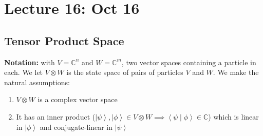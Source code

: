 \documentclass[12pt]{article}
\newcommand{\brak}[1]{\left\langle #1 \right\rangle}
\newcommand{\C}{\mathbb{C}}
\newcommand{\ket}[1]{\left\vert #1 \right\rangle}
\begin{document}
\section*{Lecture 16: Oct 16}
\subsection*{Tensor Product Space}
\textbf{Notation:} with $V = \C^n$ and $W = \C^m$, two vector spaces containing a particle in each. We let $V \otimes W$ is the state space of pairs of particles $V$ and $W$. We make the natural assumptions:
\begin{enumerate}
    \item $V \otimes W$ is a complex vector space 
    \item It has an inner product ($\ket \psi, \ket \phi \in V\otimes W \implies \brak{\psi \; | \; \phi} \in \C$) which is linear in $\ket \phi$ and conjugate-linear in $\ket \psi$
\end{enumerate}
\end{document}
